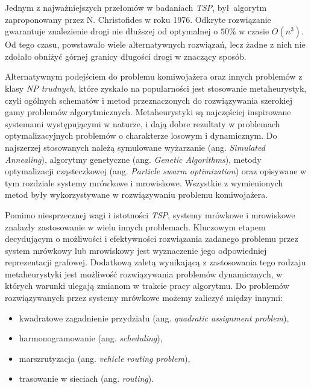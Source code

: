 {{        Jednym z najważniejszych przełomów w badaniach \textit{TSP}, był algorytm zaproponowany przez N. Christofides w
        roku 1976. Odkryte rozwiązanie gwarantuje znalezienie drogi nie dłuższej od optymalnej o $50\%$ w czasie
        $O(n^3)$\cite{Christofides1976WorstCaseAO}. Od tego czasu, powstawało wiele alternatywnych rozwiązań, lecz żadne
        z nich nie zdołało obniżyć górnej granicy długości drogi w znaczący sposób.

        Alternatywnym podejściem do problemu komiwojażera oraz innych problemów z klasy \textit{NP trudnych}, które
        zyskało na popularności jest stosowanie metaheurystyk, czyli ogólnych schematów i metod przeznaczonych do
        rozwiązywania szerokiej gamy problemów algorytmicznych. Metaheurystyki są najczęściej inspirowane systemami
        występującymi w naturze, i dają dobre rezultaty w problemach optymalizacyjnych problemów o charakterze losowym i
        dynamicznym\cite{Bianchi2008ASO}. Do najszerzej stosowanych należą symulowane wyżarzanie (ang. \textit{Simulated
        Annealing})\cite{Kirkpatrick1983OptimizationBS}, algorytmy genetyczne (ang. \textit{Genetic
        Algorithms})\cite{Fraser1957SimulationOG}, metody optymalizacji cząsteczkowej (ang. \textit{Particle swarm
        optimization})\cite{Poli2007ParticleSO} oraz opisywane w tym rozdziale systemy mrówkowe i mrowiskowe. Wszystkie
        z wymienionych metod były wykorzystywane w rozwiązywaniu problemu komiwojażera\cite{Prabakaran2019ASO,
        Mazidi2017MetaHeuristicAF}.

        Pomimo niesprzecznej wagi i istotności \textit{TSP}, systemy mrówkowe i mrowiskowe znalazły zastosowanie w wielu
        innych problemach. Kluczowym etapem decydującym o możliwości i efektywności rozwiązania zadanego problemu przez
        system mrówkowy lub mrowiskowy jest wyznaczenie jego odpowiedniej reprezentacji grafowej\cite{Dorigo1991AntSA}.
        Dodatkową zaletą wynikającą z zastosowania tego rodzaju metaheurystyki jest możliwość rozwiązywania problemów
        dynamicznych, w których warunki ulegają zmianom w trakcie pracy algorytmu. Do problemów rozwiązywanych przez
        systemy mrówkowe możemy zaliczyć między innymi:

        \begin{itemize}
            \item kwadratowe zagadnienie przydziału (ang. \textit{quadratic assignment problem})\cite{Maniezzo1999TheAS,
            Gambardella1999AntCF},
            \item harmonogramowanie (ang. \textit{scheduling})\cite{JSSchedulingColoroni94, Merkle2002AntCO},
            \item marszrutyzacja (ang. \textit{vehicle routing problem})\cite{Bullnheimer1999ApplyingTA},
            \item trasowanie w sieciach (ang. \textit{routing})\cite{Caro1999AntNetAM, Bonabeau1998RoutingIT}.
        \end{itemize}
    }

}
